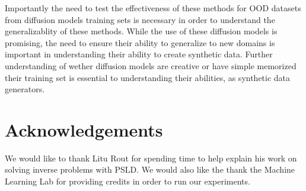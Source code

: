 \documentclass{article}
\begin{document}
Importantly the need to test the effectiveness of these methods for OOD datasets from diffusion models training sets is necessary in order to understand the generalizablity 
of these methods. While the use of these diffusion models is promising, the need to ensure their ability to generalize to new domains is important in understanding their ability
to create synthetic data. Further understanding of wether diffusion models are creative or have simple memorized their training set is essential to understanding their abilities,
as synthetic data generators.

\section*{Acknowledgements}

We would like to thank Litu Rout for spending time to help explain his work on solving inverse problems with PSLD. We would also like the thank the Machine Learning Lab for
providing credits in order to run our experiments.



\end{document}
